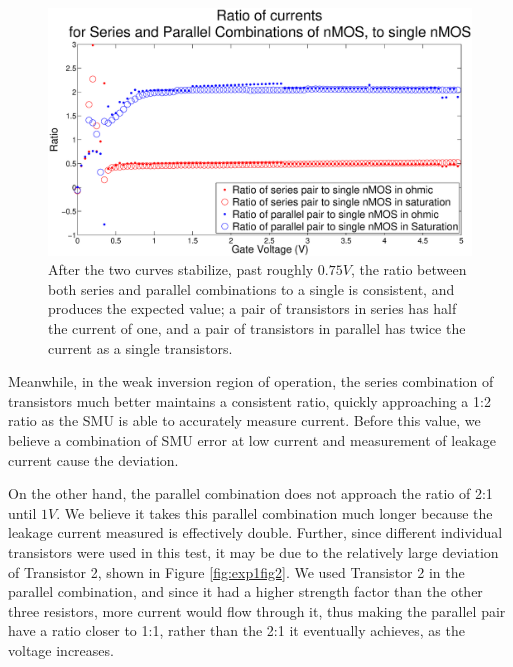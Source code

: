 \begin{figure}[H]
\centering
\includegraphics[width=\linewidth]{../Figures/Experiment2Ratios.eps}
\caption{After the two curves stabilize, past roughly $0.75V$, the ratio between both series and parallel combinations to a single \nMOS is consistent, and produces the expected value; a pair of \nMOS transistors in series has half the current of one, and a pair of \nMOS transistors in parallel has twice the current as a single transistors.}
\label{fig:exp2ratios}
\end{figure}

Meanwhile, in the weak inversion region of operation, the series combination of transistors much better maintains a consistent ratio, quickly approaching a 1:2 ratio as the SMU is able to accurately measure current. Before this value, we believe a combination of SMU error at low current and measurement of leakage current cause the deviation. 


On the other hand, the parallel combination does not approach the ratio of 2:1 until $1V$. We believe it takes this parallel combination much longer because the leakage current measured is effectively double. Further, since different individual transistors were used in this test, it may be due to the relatively large deviation of Transistor 2, shown in Figure \ref{fig:exp1fig2}. We used Transistor 2 in the parallel combination, and since it had a higher strength factor than the other three resistors, more current would flow through it, thus making the parallel pair have a ratio closer to 1:1, rather than the 2:1 it eventually achieves, as the voltage increases.



